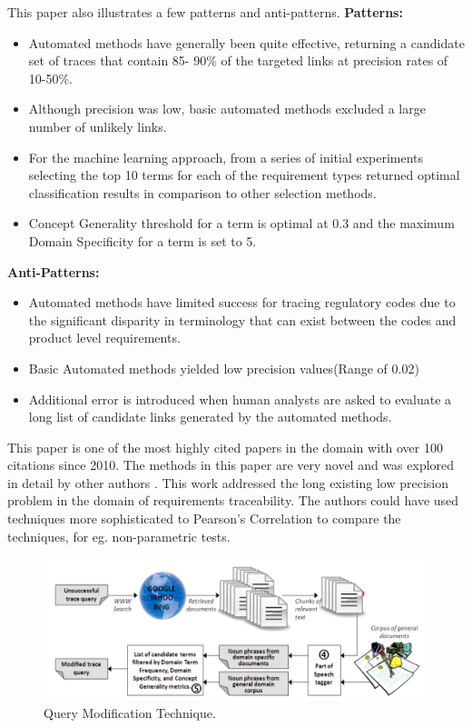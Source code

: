 \documentclass{report}
\begin{document}
This paper also illustrates a few patterns and anti-patterns.
\textbf{Patterns:}
\begin{itemize}
\item Automated methods have generally been quite effective, returning a candidate set of traces that 
contain 85- 90\% of the targeted links at precision rates of 10-50\%.
\item Although precision was low, basic automated methods excluded a large number of unlikely links.
\item For the machine learning approach, from a series of initial experiments selecting the top 10 
terms for each of the requirement types returned optimal classification results in comparison to other
selection methods.
\item Concept Generality threshold for a term is optimal at 0.3 and the maximum Domain Specificity for
a term is set to 5.
\end{itemize}

\textbf{Anti-Patterns:}
\begin{itemize}
\item Automated methods have limited success for tracing regulatory codes due to the significant disparity
in terminology that can exist between the codes and product level requirements.
\item Basic Automated methods yielded low precision values(Range of 0.02)
\item Additional error is introduced when human analysts are asked to evaluate a long list of candidate 
links generated by the automated methods.
\end{itemize}

This paper is one of the most highly cited papers in the domain with over 100 citations since 2010. The methods
in this paper are very novel and was explored in detail by other authors \cite{gibiec10}. This work addressed the
long existing low precision problem in the domain of requirements traceability. The authors could have used 
techniques more sophisticated to Pearson's Correlation to compare the techniques, for eg. non-parametric tests.

\begin{figure}[htbp]
\begin{minipage}{\linewidth}
\centering
\includegraphics[scale=0.75]{img/query-modification}
\caption{Query Modification Technique.}
\label{fig:queryMod}
\end{minipage}
\end{figure}
\end{document}
